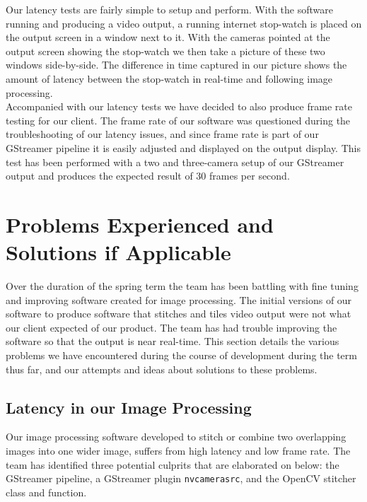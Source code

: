 \documentclass[letterpaper,10pt,serif,draftclsnofoot,onecolumn,compsoc,titlepage]{IEEEtran}
\begin{document}
Our latency tests are fairly simple to setup and perform. With the software running and 
producing a video output, a running internet stop-watch is placed on the output screen 
in a window 
next to it. With the cameras pointed at the output screen showing the stop-watch we then 
take a picture of these two windows side-by-side. The difference in time captured in our 
picture shows the amount of latency between the stop-watch in real-time and following 
image processing. \\

Accompanied with our latency tests we have decided to also produce frame rate testing for 
our client. The frame rate of our software was questioned during the troubleshooting of 
our latency issues, and since frame rate is part of our GStreamer pipeline it is easily 
adjusted and displayed on the output display. This test has been performed with a two and 
three-camera setup of our GStreamer output and produces the expected result of 30 frames 
per second.  \\

\section{Problems Experienced and Solutions if Applicable}

Over the duration of the spring term the team has been battling with fine tuning and 
improving software created for image processing. The initial versions of our software to 
produce software that stitches and tiles video output were not what our client expected 
of our product. The team has had trouble improving the software so that the output is 
near real-time. This section details the various problems we have encountered during 
the course of development during the term thus far, and our attempts and ideas about 
solutions to these problems.

\subsection{Latency in our Image Processing}
Our image processing software developed to stitch or combine two overlapping 
images into one wider image, suffers from high latency and low frame rate. The team has 
identified three potential culprits that are elaborated on below: the GStreamer pipeline, 
a GStreamer plugin \texttt{nvcamerasrc}, and the OpenCV stitcher class and function. 
\end{document}
